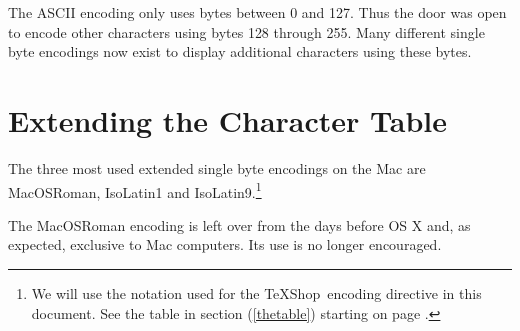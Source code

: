 \documentclass[letterpaper,11pt]{article}
\newcommand{\TS}{\textsf{\TeX Shop}}
\newcommand{\acr}[1]{\textsf{#1}}
\begin{document}
The \acr{ASCII} encoding only uses bytes between 0 and 127. Thus the door was open to encode
other characters using bytes 128 through 255. Many different single byte encodings now exist to display additional characters using these bytes.

%
%
%

\section{Extending the Character Table}


The three most used extended single byte encodings on the Mac are \acr{MacOSRoman}, \acr{IsoLatin1} and \acr{IsoLatin9}.\footnote{We will use the notation used for the \TS\ encoding directive in this document. See the table in section (\ref{thetable}) starting on page \pageref{thetable}.}

The \acr{MacOSRoman} encoding is left over from the days before \acr{OS X} and, as expected, exclusive to Mac computers. Its use is no longer encouraged.
\end{document}
